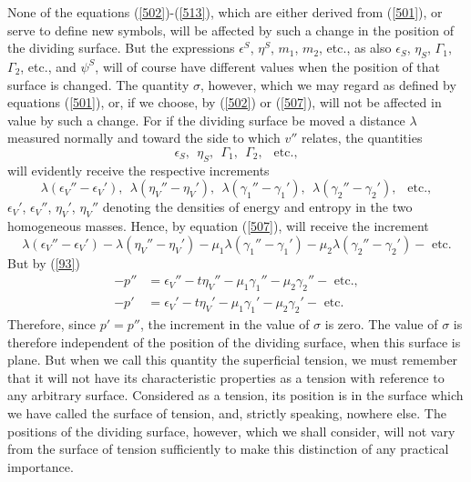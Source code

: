 \documentclass[12pt]{article}
\begin{document}
{None of the equations (\ref{502})-(\ref{513}), which are either derived from (\ref{501}), or serve to define new symbols, will be affected by such a change in the position of the dividing surface. But the expressions $\epsilon^S$, $\eta^S$, $m_1$, $m_2$, etc., as also $\epsilon_S$, $\eta_S$, $\Gamma_1$, $\Gamma_2$, etc., and $\psi^S$, will of course have different values when the position of that surface is changed. The quantity $\sigma$, however, which we may regard as defined by equations (\ref{501}), or, if we choose, by (\ref{502}) or (\ref{507}), will not be affected in value by such a change. For if the dividing surface be moved a distance $\lambda$ measured normally and toward the side to which $v''$ relates, the quantities
$$\epsilon_S, \ \ \eta_S, \ \ \Gamma_1, \ \ \Gamma_2, \ \ \text{ etc.},$$
will evidently receive the respective increments
$$\lambda(\epsilon_{V}''-\epsilon_{V}'), \ \ \lambda(\eta_{V}''-\eta_{V}'), \ \ \lambda(\gamma_1''-\gamma_1'), \ \ \lambda(\gamma_2''-\gamma_2'), \ \  \text{ etc.}, $$
$\epsilon_{V}'$, $\epsilon_{V}''$, $\eta_{V}'$, $\eta_{V}''$ denoting the densities of energy and entropy in the two homogeneous masses. Hence, by equation (\ref{507}),  will receive the increment
$$ \lambda(\epsilon_{V}''-\epsilon_{V}') - \lambda(\eta_{V}''-\eta_{V}')-\mu_1 \lambda(\gamma_1''-\gamma_1')-\mu_2 \lambda(\gamma_2''-\gamma_2') - \text{ etc.}$$
But by (\ref{93})
\begin{align*}
-p'' &= \epsilon_{V}'' - t\eta_V'' - \mu_1 \gamma_1'' - \mu_2 \gamma_2''  - \text{ etc.}, \\ 
-p' &= \epsilon_{V}' - t\eta_V' - \mu_1 \gamma_1' - \mu_2 \gamma_2'  - \text{ etc.}\end{align*}
Therefore, since $p'=p''$, the increment in the value of $\sigma$ is zero. The value of $\sigma$ is therefore independent of the position of the dividing surface, when this surface is plane. But when we call this quantity the superficial tension, we must remember that it will not have its characteristic properties as a tension with reference to any arbitrary surface. Considered as a tension, its position is in the surface which we have called the surface of tension, and, strictly speaking, nowhere else. The positions of the dividing surface, however, which we shall consider, will not vary from the surface of tension sufficiently to make this distinction of any practical importance.


}
\end{document}

